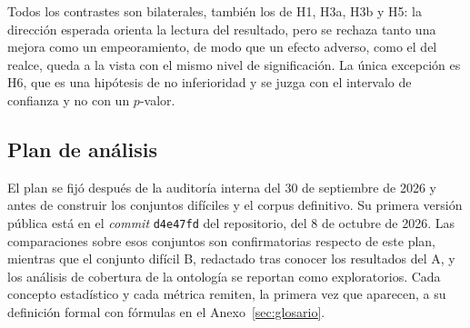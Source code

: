 \documentclass[11pt,letterpaper]{article}
\numberwithin{equation}{section}
\begin{document}
Todos los contrastes son bilaterales, también los de H1, H3a, H3b y H5: la dirección esperada orienta la lectura del resultado, pero se rechaza tanto una mejora como un empeoramiento, de modo que un efecto adverso, como el del realce, queda a la vista con el mismo nivel de significación. La única excepción es H6, que es una hipótesis de no inferioridad y se juzga con el intervalo de confianza y no con un $p$-valor.

\subsection{Plan de análisis}
\label{sec:plan-analisis}
El plan se fijó después de la auditoría interna del 30 de septiembre de 2026 y antes de construir los conjuntos difíciles y el corpus definitivo. Su primera versión pública está en el \textit{commit} \texttt{d4e47fd} del repositorio, del 8 de octubre de 2026. Las comparaciones sobre esos conjuntos son confirmatorias respecto de este plan, mientras que el conjunto difícil B, redactado tras conocer los resultados del A, y los análisis de cobertura de la ontología se reportan como exploratorios. Cada concepto estadístico y cada métrica remiten, la primera vez que aparecen, a su definición formal con fórmulas en el Anexo~\ref{sec:glosario}.
\end{document}
